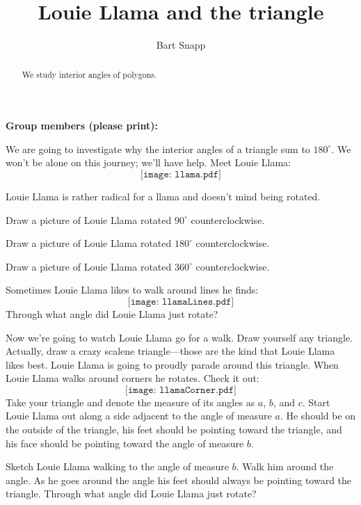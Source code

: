 \documentclass[handout,nooutcomes,noauthor]{ximera}
\title{Louie Llama and the triangle}
\author{Bart Snapp}
\begin{document}
\begin{abstract}
  We study interior angles of polygons.
\end{abstract}
\maketitle

\noindent\textbf{Group members (please print):}\ \hrulefill \\

\hrulefill



We are going to investigate why the interior angles of a triangle sum
to $180^\circ$. We won't be alone on this journey; we'll have help.
Meet Louie Llama:
\[
\texttt{[image: llama.pdf]}
\]

Louie Llama is rather radical for a llama and doesn't mind being
rotated.

\begin{problem} 
Draw a picture of Louie Llama rotated $90^\circ$ counterclockwise.
\end{problem}

\begin{problem} 
Draw a picture of Louie Llama rotated $180^\circ$ counterclockwise.
\end{problem}

\begin{problem} 
Draw a picture of Louie Llama rotated $360^\circ$ counterclockwise.
\end{problem}

\begin{problem} Sometimes Louie Llama likes to walk around lines he finds:
\[
\texttt{[image: llamaLines.pdf]}
\]
Through what angle did Louie Llama just rotate?
\end{problem}


Now we're going to watch Louie Llama go for a walk. Draw yourself any
triangle.  Actually, draw a crazy scalene triangle---those are the kind that Louie
Llama likes best. Louie Llama is going to proudly parade around this
triangle. When Louie Llama walks around corners he rotates. Check
it out:
\[
\texttt{[image: llamaCorner.pdf]}
\]
Take your triangle and denote the measure of its angles as $a$, $b$,
and $c$. Start Louie Llama out along a side adjacent to the angle of
measure $a$. He should be on the outside of the triangle, his feet
should be pointing toward the triangle, and his face should be
pointing toward the angle of measure $b$.
\begin{problem} 
Sketch Louie Llama walking to the angle of measure $b$. Walk him
around the angle. As he goes around the angle his feet should always
be pointing toward the triangle. Through what angle did Louie Llama
just rotate?
\end{problem}
\end{document}
